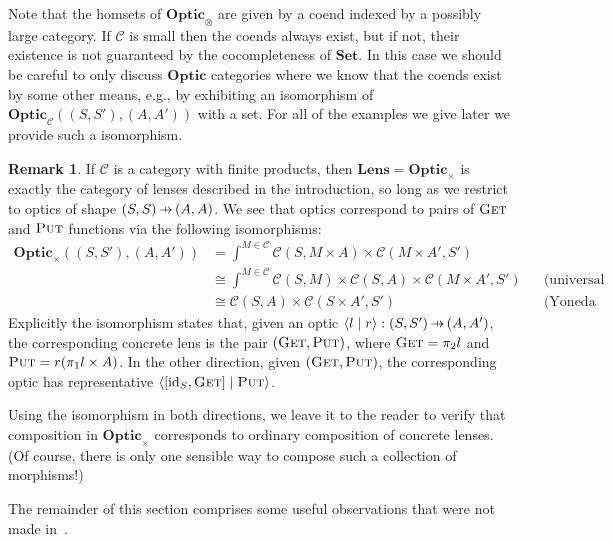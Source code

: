 \documentclass[11pt,letterpaper]{article}
\theoremstyle{plain}
\theoremstyle{definition}
\newtheorem{remark}[theorem]{Remark}
\newcommand{\C}{\mathscr{C}}
\newcommand{\Set}{\mathbf{Set}}
\newcommand{\Optic}{\mathbf{Optic}}
\newcommand{\Lens}{\mathbf{Lens}}
\newcommand{\conc}{\mathbb{C}}
\newcommand{\id}{\mathrm{id}}
\newcommand{\rep}[2]{{\ensuremath \left\langle #1 \mid #2 \right\rangle}}
\newcommand{\fget}{\textsc{Get}}
\newcommand{\fput}{\textsc{Put}}
\newcommand{\hto}{\ensuremath{\,\mathaccent\shortmid\rightarrow\,}}
\begin{document}
  Note that the homsets of $\Optic_\otimes$ are given by a coend indexed by a possibly large category. If $\C$ is small then the coends always exist, but if not, their existence is not guaranteed by the cocompleteness of $\Set$. In this case we should be careful to only discuss $\Optic$ categories where we know that the coends exist by some other means, e.g., by exhibiting an isomorphism of $\Optic_\C((S, S'), (A, A'))$ with a set. For all of the examples we give later we provide such a isomorphism.

\begin{remark}
If $\C$ is a category with finite products, then $\Lens = \Optic_\times$ is exactly the category of lenses described in the introduction, so long as we restrict to optics of shape $(S, S) \hto (A, A)$. We see that optics correspond to pairs of $\fget$ and $\fput$ functions via the following isomorphisms:
\begin{align*}
  \Optic_\times((S, S'), (A, A'))
  &= \int^{M \in \C} \C(S, M \times A) \times \C(M \times A', S') \\
  &\cong \int^{M \in \C} \C(S, M) \times \C(S, A) \times \C(M \times A', S') && \text{(universal property of product)} \\
  &\cong \C(S, A) \times \C(S \times A', S') && \text{(Yoneda reduction)}
\end{align*}
Explicitly the isomorphism states that, given an optic $\rep{l}{r} : (S, S') \hto (A, A')$, the corresponding concrete lens is the pair $(\fget, \fput)$, where $\fget = \pi_2 l$ and $\fput = r (\pi_1 l \times A)$. In the other direction, given $(\fget, \fput)$, the corresponding optic has representative $\rep{[\id_S, \fget]}{\fput}$.

Using the isomorphism in both directions, we leave it to the reader to verify that composition in $\Optic_\times$ corresponds to ordinary composition of concrete lenses. (Of course, there is only one sensible way to compose such a collection of morphisms!)
\end{remark}

The remainder of this section comprises some useful observations that were not made in~\cite{Doubles}.
\end{document}
